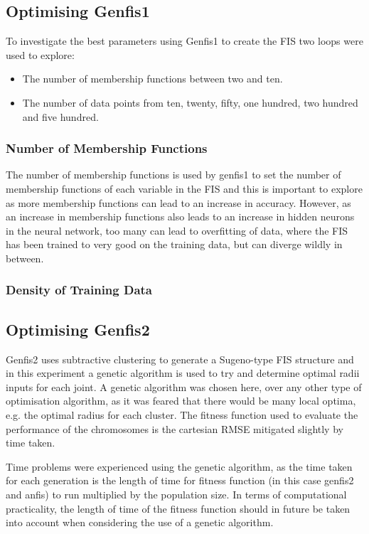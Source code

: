 \documentclass[11.5pt, twoside, a4paper]{article}
\begin{document}
\subsection{Optimising Genfis1}
To investigate the best parameters using Genfis1 to create the FIS two loops were used to explore:
\begin{itemize}
\item The number of membership functions between two and ten.
\item The number of data points from ten, twenty, fifty, one hundred, two hundred and five hundred.
\end{itemize}

\subsubsection{Number of Membership Functions}
The number of membership functions is used by genfis1 to set the number of membership functions of each variable in the FIS \cite{genfis1} and this is important to explore as more membership functions can lead to an increase in accuracy. However, as an increase in membership functions also leads to an increase in hidden neurons in the neural network, too many can lead to overfitting of data, where the FIS has been trained to very good on the training data, but can diverge wildly in between. 

\subsubsection{Density of Training Data}

\subsection{Optimising Genfis2}
Genfis2 uses subtractive clustering to generate a Sugeno-type FIS structure \cite{genfis2} and in this experiment a genetic algorithm is used to try and determine optimal radii inputs for each joint. A genetic algorithm was chosen here, over any other type of optimisation algorithm, as it was feared that there would be many local optima, e.g. the optimal radius for each cluster. The fitness function used to evaluate the performance of the chromosomes is the cartesian RMSE mitigated slightly by time taken.

Time problems were experienced using the genetic algorithm, as the time taken for each generation is the length of time for fitness function (in this case genfis2 and anfis) to run multiplied by the population size. In terms of computational practicality, the length of time of the fitness function should in future be taken into account when considering the use of a genetic algorithm. 
\end{document}
